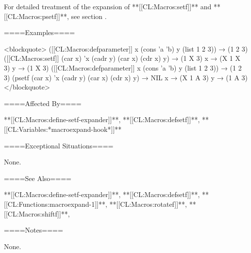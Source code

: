 For detailed treatment of the expansion of **[[CL:Macros:setf]]** and **[[CL:Macros:psetf]]**, see section {\secref\KindsOfPlaces}.

====Examples====

<blockquote> ([[CL:Macros:defparameter]] x (cons 'a 'b) y (list 1 2 3)) → (1 2 3) ([[CL:Macros:setf]] (car x) 'x (cadr y) (car x) (cdr x) y) → (1 X 3) x → (X 1 X 3) y → (1 X 3) ([[CL:Macros:defparameter]] x (cons 'a 'b) y (list 1 2 3)) → (1 2 3) (psetf (car x) 'x (cadr y) (car x) (cdr x) y) → NIL x → (X 1 A 3) y → (1 A 3) </blockquote>

====Affected By====

**[[CL:Macros:define-setf-expander]]**, **[[CL:Macros:defsetf]]**, **[[CL:Variables:*macroexpand-hook*]]**

====Exceptional Situations====

None.

====See Also====

**[[CL:Macros:define-setf-expander]]**, **[[CL:Macros:defsetf]]**, **[[CL:Functions:macroexpand-1]]**, **[[CL:Macros:rotatef]]**, **[[CL:Macros:shiftf]]**, {\secref\GeneralizedReference}

====Notes====

None.

 
